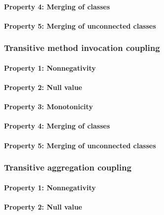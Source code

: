 \paragraph{Property 4: Merging of classes}

\paragraph{Property 5: Merging of unconnected classes}

\subsubsection{Transitive method invocation coupling}
\paragraph{Property 1: Nonnegativity}

\paragraph{Property 2: Null value}

\paragraph{Property 3: Monotonicity}

\paragraph{Property 4: Merging of classes}

\paragraph{Property 5: Merging of unconnected classes}

\subsubsection{Transitive aggregation coupling}
\paragraph{Property 1: Nonnegativity}

\paragraph{Property 2: Null value}

